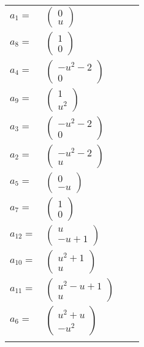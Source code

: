 \documentclass[1p]{elsarticle_modified}
\theoremstyle{definition}
\begin{document}
\begin{tabular}{m{7pt} m{180pt} m{7pt} m{180pt} }
\flushright $a_{1}=$&$\begin{pmatrix}0\\u\end{pmatrix}$ \\
\flushright $a_{8}=$&$\begin{pmatrix}1\\0\end{pmatrix}$ \\
\flushright $a_{4}=$&$\begin{pmatrix}- u^2-2\\0\end{pmatrix}$ \\
\flushright $a_{9}=$&$\begin{pmatrix}1\\u^2\end{pmatrix}$ \\
\flushright $a_{3}=$&$\begin{pmatrix}- u^2-2\\0\end{pmatrix}$ \\
\flushright $a_{2}=$&$\begin{pmatrix}- u^2-2\\u\end{pmatrix}$ \\
\flushright $a_{5}=$&$\begin{pmatrix}0\\- u\end{pmatrix}$ \\
\flushright $a_{7}=$&$\begin{pmatrix}1\\0\end{pmatrix}$ \\
\flushright $a_{12}=$&$\begin{pmatrix}u\\- u+1\end{pmatrix}$ \\
\flushright $a_{10}=$&$\begin{pmatrix}u^2+1\\u\end{pmatrix}$ \\
\flushright $a_{11}=$&$\begin{pmatrix}u^2- u+1\\u\end{pmatrix}$ \\
\flushright $a_{6}=$&$\begin{pmatrix}u^2+u\\- u^2\end{pmatrix}$\\&\end{tabular}
\end{document}
